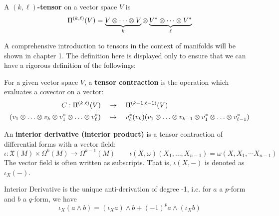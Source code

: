 \documentclass{article}
\begin{document}
\begin{definition}[Tensor]
    A \textbf{$(k, \ell)$-tensor} on a vector space $V$ is
    \[
        \Pi^{(k, \ell)}(V) = \underbrace{V \otimes \cdots \otimes V}_{k} \otimes \underbrace{V^{\ast} \otimes \cdots \otimes V^{\ast}}_{\ell}
    \]
\end{definition}

\textstart
A comprehensive introduction to tensors in the context of manifolds will be shown in chapter 1. The definition here is displayed only to ensure that we can have a rigorous definition of the followings:

\begin{definition}
    For a given vector space $V$, a \textbf{tensor contraction} is the operation which evaluates a covector on a vector:
    \begin{align*}
        C: \Pi^{(k, \ell)}(V)\quad & \to \quad \Pi^{(k - 1, \ell - 1)}(V) \\[2pt]
        (v_1 \tensor \dots \tensor v_k \tensor v_1^{\ast} \tensor \dots \tensor v_{\ell}^{\ast})\quad & \mapsto \quad v_{\ell}^{\ast}(v_k) (v_1 \tensor \dots \tensor v_{k - 1} \tensor v_1^{\ast} \tensor \dots \tensor v_{\ell - 1}^{\ast})
    \end{align*}
\end{definition}

\begin{definition}
    An \textbf{interior derivative (interior product)} is a tensor contraction of differential forms with a vector field:
    \[
        \iota: \mathfrak{X}(M) \times \Omega^{k}(M) \to \Omega^{k-1}(M) \qquad \iota(X, \omega)(X_1, \dots, X_{n-1}) = \omega(X, X_1, \dotsm X_{n-1})
    \]
    The vector field is often written as subscripts. That is, $\iota(X, -)$ is denoted as $\iota_X(-)$.
\end{definition}

\begin{proposition}
    Interior Derivative is the unique anti-derivation of degree -1, i.e. for $a$ a $p$-form and $b$ a $q$-form, we have
    \[
        \iota_X(a \wedge b) = (\iota_X a) \wedge b + (-1)^p a \wedge (\iota_X b)
    \]
\end{proposition}
\end{document}
